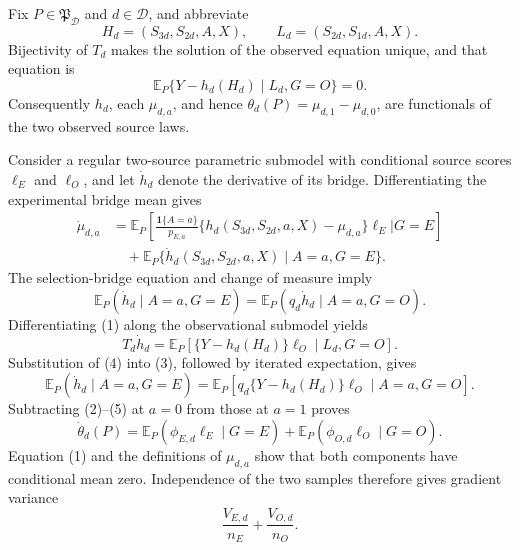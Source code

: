 Fix \(P\in\mathfrak P_{\mathcal D}\) and \(d\in\mathcal D\), and abbreviate
\[
 H_d=(S_{3d},S_{2d},A,X),\qquad L_d=(S_{2d},S_{1d},A,X).
\]
Bijectivity of \(T_d\) makes the solution of the observed equation unique, and that equation is
\[
 \mathbb E_P\{Y-h_d(H_d)\mid L_d,G=O\}=0. \tag{1}
\]
Consequently \(h_d\), each \(\mu_{d,a}\), and hence \(\theta_d(P)=\mu_{d,1}-\mu_{d,0}\), are functionals of the two observed source laws.

Consider a regular two-source parametric submodel with conditional source scores \(\ell_E\) and \(\ell_O\), and let \(\dot h_d\) denote the derivative of its bridge.  Differentiating the experimental bridge mean gives
\[
\begin{aligned}
 \dot\mu_{d,a}
 &=\mathbb E_P\!\left[
   \frac{\mathbf 1\{A=a\}}{p_{E,a}}
   \{h_d(S_{3d},S_{2d},a,X)-\mu_{d,a}\}\ell_E
   \mathrel{\Big|}G=E\right]\\
 &\quad+\mathbb E_P\{\dot h_d(S_{3d},S_{2d},a,X)\mid A=a,G=E\}.
\end{aligned}\tag{2}
\]
The selection-bridge equation and change of measure imply
\[
 \mathbb E_P(\dot h_d\mid A=a,G=E)
 =\mathbb E_P(q_d\dot h_d\mid A=a,G=O). \tag{3}
\]
Differentiating (1) along the observational submodel yields
\[
 T_d\dot h_d
 =\mathbb E_P[\{Y-h_d(H_d)\}\ell_O\mid L_d,G=O]. \tag{4}
\]
Substitution of (4) into (3), followed by iterated expectation, gives
\[
 \mathbb E_P(\dot h_d\mid A=a,G=E)
 =\mathbb E_P[q_d\{Y-h_d(H_d)\}\ell_O\mid A=a,G=O]. \tag{5}
\]
Subtracting (2)--(5) at \(a=0\) from those at \(a=1\) proves
\[
 \dot\theta_d(P)
 =\mathbb E_P(\phi_{E,d}\ell_E\mid G=E)
  +\mathbb E_P(\phi_{O,d}\ell_O\mid G=O). \tag{6}
\]
Equation (1) and the definitions of \(\mu_{d,a}\) show that both components have conditional mean zero.  Independence of the two samples therefore gives gradient variance
\[
 \frac{V_{E,d}}{n_E}+\frac{V_{O,d}}{n_O}. \tag{7}
\]

